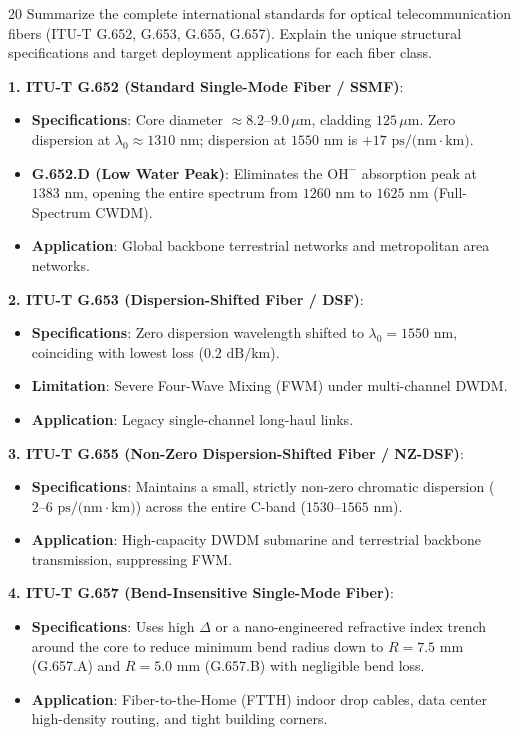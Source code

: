 \begin{theoryq}{20}
Summarize the complete international standards for optical telecommunication fibers (ITU-T G.652, G.653, G.655, G.657). Explain the unique structural specifications and target deployment applications for each fiber class.
\end{theoryq}
\begin{theorysol}
\textbf{1. ITU-T G.652 (Standard Single-Mode Fiber / SSMF)}:
\begin{itemize}
    \item \textbf{Specifications}: Core diameter $\approx 8.2\text{--}9.0\,\mu\text{m}$, cladding $125\,\mu\text{m}$. Zero dispersion at $\lambda_0 \approx 1310\text{ nm}$; dispersion at $1550\text{ nm}$ is $+17\text{ ps/(nm}\cdot\text{km)}$.
    \item \textbf{G.652.D (Low Water Peak)}: Eliminates the $\text{OH}^-$ absorption peak at $1383\text{ nm}$, opening the entire spectrum from $1260\text{ nm}$ to $1625\text{ nm}$ (Full-Spectrum CWDM).
    \item \textbf{Application}: Global backbone terrestrial networks and metropolitan area networks.
\end{itemize}

\textbf{2. ITU-T G.653 (Dispersion-Shifted Fiber / DSF)}:
\begin{itemize}
    \item \textbf{Specifications}: Zero dispersion wavelength shifted to $\lambda_0 = 1550\text{ nm}$, coinciding with lowest loss ($0.2\text{ dB/km}$).
    \item \textbf{Limitation}: Severe Four-Wave Mixing (FWM) under multi-channel DWDM.
    \item \textbf{Application}: Legacy single-channel long-haul links.
\end{itemize}

\textbf{3. ITU-T G.655 (Non-Zero Dispersion-Shifted Fiber / NZ-DSF)}:
\begin{itemize}
    \item \textbf{Specifications}: Maintains a small, strictly non-zero chromatic dispersion ($2\text{--}6\text{ ps/(nm}\cdot\text{km)}$) across the entire C-band ($1530\text{--}1565\text{ nm}$).
    \item \textbf{Application}: High-capacity DWDM submarine and terrestrial backbone transmission, suppressing FWM.
\end{itemize}

\textbf{4. ITU-T G.657 (Bend-Insensitive Single-Mode Fiber)}:
\begin{itemize}
    \item \textbf{Specifications}: Uses high $\Delta$ or a nano-engineered refractive index trench around the core to reduce minimum bend radius down to $R = 7.5\text{ mm}$ (G.657.A) and $R = 5.0\text{ mm}$ (G.657.B) with negligible bend loss.
    \item \textbf{Application}: Fiber-to-the-Home (FTTH) indoor drop cables, data center high-density routing, and tight building corners.
\end{itemize}
\end{theorysol}
\vspace{4mm}
